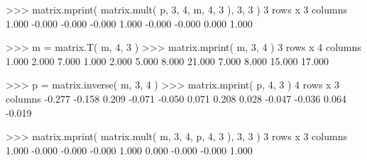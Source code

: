 \begin{pyglist}[language=python,fvset={frame=single}]
>>> matrix.mprint( matrix.mult( p, 3, 4, m, 4, 3 ), 3, 3 )
3 rows x 3 columns
   1.000   -0.000   -0.000 
  -0.000    1.000   -0.000 
  -0.000    0.000    1.000 

>>> m = matrix.T( m, 4, 3 )
>>> matrix.mprint( m, 3, 4 )
3 rows x 4 columns
   1.000    2.000    7.000    1.000 
   2.000    5.000    8.000   21.000 
   7.000    8.000   15.000   17.000 

>>> p = matrix.inverse( m, 3, 4 )
>>> matrix.mprint( p, 4, 3 )
4 rows x 3 columns
  -0.277   -0.158    0.209 
  -0.071   -0.050    0.071 
   0.208    0.028   -0.047 
  -0.036    0.064   -0.019 

>>> matrix.mprint( matrix.mult( m, 3, 4, p, 4, 3 ), 3, 3 )
3 rows x 3 columns
   1.000   -0.000   -0.000 
  -0.000    1.000    0.000 
  -0.000   -0.000    1.000 
\end{pyglist}
